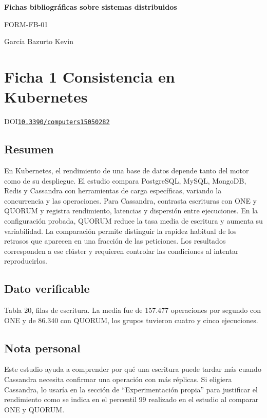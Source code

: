\documentclass[11pt,a4paper,onecolumn]{article}
\begin{document}
\begin{center}
{\Large\bfseries Fichas bibliográficas sobre sistemas distribuidos}\par
\medskip FORM-FB-01
\par \medskip García Bazurto Kevin
\end{center}

\section*{Ficha 1 Consistencia en Kubernetes}

\noindent\cite{redzepagic_empirical_2026}\enspace{}

\noindent DOI\enspace\href{https://doi.org/10.3390/computers15050282}{\nolinkurl{10.3390/computers15050282}}

\subsection*{Resumen}

En Kubernetes, el rendimiento de una base de datos depende tanto del motor como de su despliegue. El estudio compara PostgreSQL, MySQL, MongoDB, Redis y Cassandra con herramientas de carga específicas, variando la concurrencia y las operaciones. Para Cassandra, contrasta escrituras con ONE y QUORUM y registra rendimiento, latencias y dispersión entre ejecuciones. En la configuración probada, QUORUM reduce la tasa media de escritura y aumenta su variabilidad. La comparación permite distinguir la rapidez habitual de los retrasos que aparecen en una fracción de las peticiones. Los resultados corresponden a ese clúster y requieren controlar las condiciones al intentar reproducirlos.

\subsection*{Dato verificable}

Tabla 20, filas de escritura. La media fue de 157.477 operaciones por segundo con ONE y de 86.340 con QUORUM, los grupos tuvieron cuatro y cinco ejecuciones.

\subsection*{Nota personal}

Este estudio ayuda a comprender por qué una escritura puede tardar más cuando Cassandra necesita confirmar una operación con más réplicas. Si eligiera Cassandra, lo usaría en la sección de “Experimentación propia” para justificar el rendimiento como se indica en el percentil 99 realizado en el estudio al comparar ONE y QUORUM.
\end{document}
